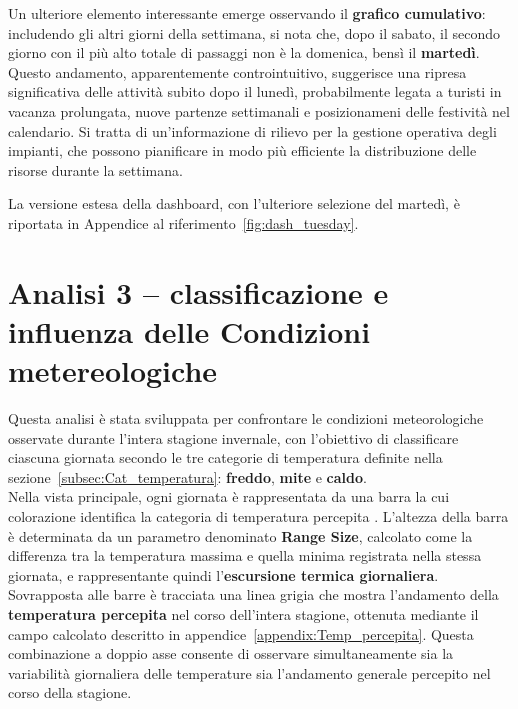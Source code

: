 Un ulteriore elemento interessante emerge osservando il \textbf{grafico cumulativo}: includendo gli altri giorni della settimana, si nota che, dopo il sabato, il secondo giorno con il più alto totale di passaggi non è la domenica, bensì il \textbf{martedì}.
Questo andamento, apparentemente controintuitivo, suggerisce una ripresa significativa delle attività subito dopo il lunedì, probabilmente legata a turisti in vacanza prolungata, nuove partenze settimanali e posizionameni delle festività nel calendario.
Si tratta di un’informazione di rilievo per la gestione operativa degli impianti, che possono pianificare in modo più efficiente la distribuzione delle risorse durante la settimana.

La versione estesa della dashboard, con l'ulteriore selezione del martedì, è riportata in Appendice al riferimento~\ref{fig:dash_tuesday}.



\section{Analisi 3 – classificazione e influenza delle Condizioni metereologiche}
\label{sec:analisi3}

Questa analisi è stata sviluppata per confrontare le condizioni meteorologiche osservate durante l’intera stagione invernale, con l’obiettivo di classificare ciascuna giornata secondo le tre categorie di temperatura definite nella sezione~\ref{subsec:Cat_temperatura}: \textbf{freddo}, \textbf{mite} e \textbf{caldo}.  \\

Nella vista principale, ogni giornata è rappresentata da una barra la cui colorazione identifica la categoria di temperatura percepita .  
L’altezza della barra è determinata da un parametro denominato \textbf{Range Size}, calcolato come la differenza tra la temperatura massima e quella minima registrata nella stessa giornata, e rappresentante quindi l’\textbf{escursione termica giornaliera}.  
Sovrapposta alle barre è tracciata una linea grigia che mostra l’andamento della \textbf{temperatura percepita} nel corso dell'intera stagione, ottenuta mediante il campo calcolato descritto in appendice~\ref{appendix:Temp_percepita}.  
Questa combinazione a doppio asse consente di osservare simultaneamente sia la variabilità giornaliera delle temperature sia l’andamento generale percepito nel corso della stagione. \\

